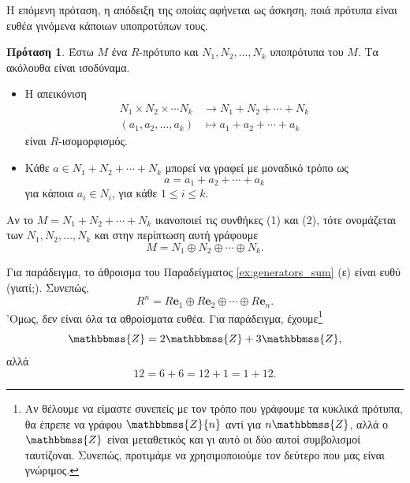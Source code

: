 \documentclass[12pt,a4paper,reqno]{amsart}
\theoremstyle{definition}
\newtheorem{proposition}[theorem]{Πρόταση}
\theoremstyle{remark}
\numberwithin{theorem}{section}
\numberwithin{exercise}{section}
\numberwithin{equation}{section}
\newcommand{\ZZ}{\mathbbmss{Z}}
\newcommand{\bfe}{\mathbf{e}}
\renewcommand{\to}{\rightarrow}
\newcommand{\defn}[1]{{\color{mylightblue}{#1}}}
\begin{document}
Η επόμενη πρόταση, η απόδειξη της οποίας αφήνεται ως άσκηση,  ποιά πρότυπα είναι ευθέα γινόμενα κάποιων υποπροτύπων τους.
\begin{proposition}
    \label{prop:direct_sum}
    Έστω $M$ ένα $R$-πρότυπο και $N_1, N_2, \dots, N_k$ υποπρότυπα του $M$. Τα ακό\-λουθα είναι ισοδύναμα.
    \begin{itemize}
        \item[(1)] Η απεικόνιση 
        \begin{align*}
            N_1 \times N_2 \times \cdots N_k &\to N_1 + N_2 + \cdots + N_k \\
            (a_1, a_2, \dots, a_k) &\mapsto a_1 + a_2 + \cdots + a_k
        \end{align*}
        είναι $R$-ισομορφισμός.
        \item[(2)] Κάθε $a \in N_1 + N_2 + \cdots + N_k$ μπορεί να γραφεί με μοναδικό τρόπο ως 
        \[
        a = a_1 + a_2 + \cdots + a_k
        \]
        για κάποια $a_i \in N_i$, για κάθε $1 \le i \le k$.
    \end{itemize}
    Αν το $M = N_1 + N_2 + \cdots + N_k$ ικανοποιεί τις συνθήκες (1) και (2), τότε ονομάζεται \defn{ευθύ άθροισμα} των $N_1, N_2, \dots, N_k$ και στην περίπτωση αυτή γράφουμε 
    \[
    M = N_1 \oplus N_2 \oplus \cdots \oplus N_k.
    \]
\end{proposition}

Για παράδειγμα, το άθροισμα του Παραδείγματος \ref{ex:generators_sum} (ε) είναι ευθύ (γιατί;). Συνεπώς,
\[
R^n = R\bfe_1 \oplus R\bfe_2 \oplus \cdots \oplus R\bfe_n.
\]
'Ομως, δεν είναι όλα τα αθροίσματα ευθέα. Για παράδειγμα, έχουμε\footnote{Αν θέλουμε να είμαστε συνεπείς με τον τρόπο που γράφουμε τα κυκλικά πρότυπα, θα έπρεπε να γράφου $\ZZ{n}$ αντί για $n\ZZ$, αλλά ο $\ZZ$ είναι μεταθετικός και γι αυτό οι δύο αυτοί συμβολισμοί ταυτίζοναι. Συνεπώς, προτιμάμε να χρησιμοποιούμε τον δεύτερο που μας είναι γνώριμος.} 
\[
\ZZ = 2\ZZ + 3\ZZ,
\]
αλλά 
\[
12 = 6 + 6 = 12 + 1 = 1 + 12.
\]
\end{document}
